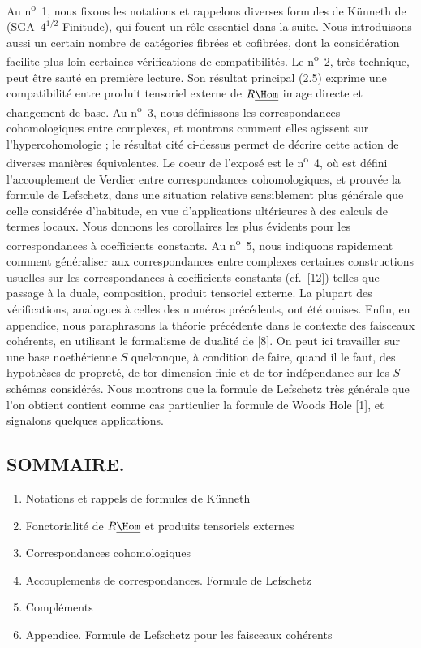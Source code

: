 Au n\textsuperscript{o}~1, nous fixons les notations et rappelons diverses formules de Künneth de (SGA~$4^{1/2}$ Finitude), qui fouent un rôle essentiel dans la suite. Nous introduisons aussi un certain nombre de catégories fibrées et cofibrées, dont la considération facilite plus loin certaines vérifications de compatibilités. Le n\textsuperscript{o}~2, très technique, peut être sauté en première lecture. Son résultat principal (2.5) exprime une compatibilité entre produit tensoriel externe de $R\underline{\Hom}$ image directe et changement de base. Au n\textsuperscript{o}~3, nous définissons les correspondances cohomologiques entre complexes, et montrons comment elles agissent sur l'hypercohomologie ; le résultat cité ci-dessus permet de décrire cette action de diverses manières équivalentes. Le coeur de l'exposé est le n\textsuperscript{o}~4, où est défini l'accouplement de Verdier entre correspondances cohomologiques, et prouvée la formule de Lefschetz, dans une situation relative sensiblement plus générale que celle considérée d'habitude, en vue d'applications ultérieures à des calculs de termes locaux. Nous donnons les corollaires les plus évidents pour les correspondances à coefficients constants. Au n\textsuperscript{o}~5, nous indiquons rapidement comment généraliser aux correspondances entre complexes certaines constructions usuelles sur les correspondances à coefficients constants (cf.~[12]) telles que passage à la duale, composition, produit tensoriel externe. La plupart des vérifications, analogues à celles des numéros précédents, ont été omises. Enfin, en appendice, nous paraphrasons la théorie précédente dans le contexte des faisceaux cohérents, en utilisant le formalisme de dualité de [8]. On peut ici travailler sur une base noethérienne $S$ quelconque, à condition de faire, quand il le faut, des hypothèses de propreté, de tor-dimension finie et de tor-indépendance sur les $S$-schémas considérés. Nous montrons que la formule de Lefschetz très générale que l'on obtient contient comme cas particulier la formule de Woods Hole [1], et signalons quelques applications.

\subsection*{SOMMAIRE.}
\begin{enumerate}[label=\arabic*.]
\item
Notations et rappels de formules de Künneth
\item Fonctorialité de $R\underline{\Hom}$ et produits tensoriels externes
\item Correspondances cohomologiques
\item Accouplements de correspondances. Formule de Lefschetz
\item Compléments
\item Appendice. Formule de Lefschetz pour les faisceaux cohérents
\end{enumerate}

